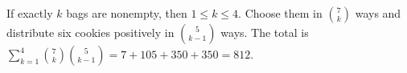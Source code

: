 If exactly $k$ bags are nonempty, then $1\le k\le4$. Choose them in $\binom7k$ ways and distribute six cookies positively in $\binom5{k-1}$ ways. The total is $\sum_{k=1}^4\binom7k\binom5{k-1}=7+105+350+350=\boxed{812}$.
